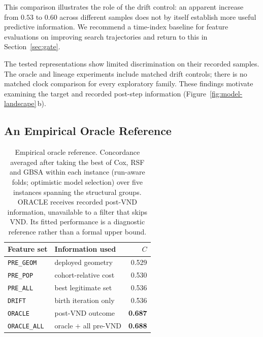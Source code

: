 \documentclass[a4paper,fleqn]{cas-dc}
\begin{document}
This comparison illustrates the role of the drift control: an apparent increase
from $0.53$ to $0.60$ across different samples does not by itself establish more
useful predictive information. We recommend a time-index baseline for feature
evaluations on improving search trajectories and return to this in
Section~\ref{sec:gate}.

The tested representations show limited discrimination on their recorded
samples. The oracle and lineage experiments include matched drift controls;
there is no matched clock comparison for every exploratory family. These
findings motivate examining the target and recorded post-step information
(Figure~\ref{fig:model-landscape}\,b).

\subsection{An Empirical Oracle Reference}\label{sec:diag-oracle}

\begin{table}[htbp]
\caption{Empirical oracle reference. Concordance averaged after taking the best of Cox, RSF and GBSA within each
instance (run-aware folds; optimistic model selection) over five instances spanning the structural groups. ORACLE
receives recorded post-VND information, unavailable to a filter that skips VND.
Its fitted performance is a diagnostic reference rather than a formal upper bound.}
\label{tab:oracle}
\centering\small
\begin{tabular}{llr}
\toprule
Feature set & Information used & $C$ \\
\midrule
\texttt{PRE\_GEOM}   & deployed geometry     & 0.529 \\
\texttt{PRE\_POP}    & cohort-relative cost  & 0.530 \\
\texttt{PRE\_ALL}    & best legitimate set   & 0.536 \\
\texttt{DRIFT}       & birth iteration only  & 0.536 \\
\midrule
\texttt{ORACLE}      & post-VND outcome      & \textbf{0.687} \\
\texttt{ORACLE\_ALL} & oracle $+$ all pre-VND & \textbf{0.688} \\
\bottomrule
\end{tabular}
\end{table}
\end{document}
